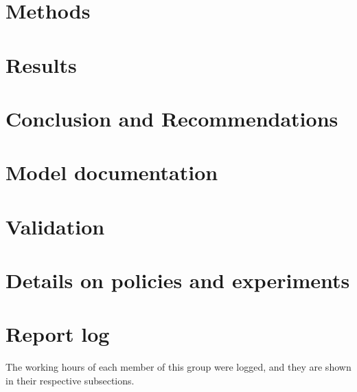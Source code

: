 \documentclass[a4paper,11, oneside]{article}
\begin{document}
\section{Methods}
\label{ch:methods}

\pagebreak

\section{Results}
\label{ch:results}

\pagebreak

\section{Conclusion and Recommendations}
\label{ch:conclusion}

\pagebreak


\printbibliography


%
\pagebreak


\appendix
\section{Model documentation}
\label{ch:model_documentation}


%
\section{Validation}
\label{ch:validation} 

\clearpage
\section{Details on policies and experiments}
\label{ch:det_policies} 

\clearpage
\section{Report log}
\label{ch:report_log}
The working hours of each member of this group were logged, and they are shown in their respective subsections.





\end{document}
